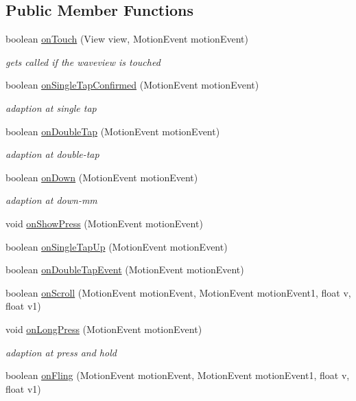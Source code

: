 \subsection*{Public Member Functions}
\begin{DoxyCompactItemize}
\item 
boolean \hyperlink{classwavesimulator_1_1WaveViewTouchListener_a325c79c04591b29d1ccc2f17538f1b4e}{on\+Touch} (View view, Motion\+Event motion\+Event)
\begin{DoxyCompactList}\small\item\em gets called if the waveview is touched \end{DoxyCompactList}\item 
boolean \hyperlink{classwavesimulator_1_1WaveViewTouchListener_a812d58658cd4766b77acc6805c11bd5e}{on\+Single\+Tap\+Confirmed} (Motion\+Event motion\+Event)
\begin{DoxyCompactList}\small\item\em adaption at single tap \end{DoxyCompactList}\item 
boolean \hyperlink{classwavesimulator_1_1WaveViewTouchListener_a9dc7880808de5d6211b235eea093010b}{on\+Double\+Tap} (Motion\+Event motion\+Event)
\begin{DoxyCompactList}\small\item\em adaption at double-\/tap \end{DoxyCompactList}\item 
boolean \hyperlink{classwavesimulator_1_1WaveViewTouchListener_a8fe377045999aa7d7e0c177602294a77}{on\+Down} (Motion\+Event motion\+Event)
\begin{DoxyCompactList}\small\item\em adaption at down-\/mm \end{DoxyCompactList}\item 
void \hyperlink{classwavesimulator_1_1WaveViewTouchListener_a27e41c2afd3355b733980f0a1b3cc443}{on\+Show\+Press} (Motion\+Event motion\+Event)
\item 
boolean \hyperlink{classwavesimulator_1_1WaveViewTouchListener_a65b57a542917ca9748b4b1a61a1dfea3}{on\+Single\+Tap\+Up} (Motion\+Event motion\+Event)
\item 
boolean \hyperlink{classwavesimulator_1_1WaveViewTouchListener_aca5036fc983c0688503c69c153c057f0}{on\+Double\+Tap\+Event} (Motion\+Event motion\+Event)
\item 
boolean \hyperlink{classwavesimulator_1_1WaveViewTouchListener_ab9902752f747fee07f7ebba8f759e6ad}{on\+Scroll} (Motion\+Event motion\+Event, Motion\+Event motion\+Event1, float v, float v1)
\item 
void \hyperlink{classwavesimulator_1_1WaveViewTouchListener_a38c5a9641b2585940c53e9be126675fe}{on\+Long\+Press} (Motion\+Event motion\+Event)
\begin{DoxyCompactList}\small\item\em adaption at press and hold \end{DoxyCompactList}\item 
boolean \hyperlink{classwavesimulator_1_1WaveViewTouchListener_ab5306d4dc5257a10a1494f8abefd102d}{on\+Fling} (Motion\+Event motion\+Event, Motion\+Event motion\+Event1, float v, float v1)
\end{DoxyCompactItemize}
